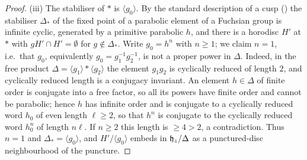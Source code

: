\begin{proof}
(iii) The stabiliser of $*$ is $\langle g_0\rangle$. By the standard description of a cusp (\cite[Ch.\ 10]{Bea83}) the stabiliser $\Delta_*$ of the fixed point of a parabolic element of a Fuchsian group is infinite cyclic, generated by a primitive parabolic $h$, and there is a horodisc $H'$ at $*$ with $gH' \cap H' = \emptyset$ for $g \notin \Delta_*$. Write $g_0 = h^n$ with $n \ge 1$; we claim $n=1$, i.e.\ that $g_0$, equivalently $g_0 = g_1^{-1}g_2^{-1}$, is not a proper power in $\Delta$. Indeed, in the free product $\Delta = \langle g_1\rangle * \langle g_2\rangle$ the element $g_1g_2$ is cyclically reduced of length $2$, and cyclically reduced length is a conjugacy invariant. An element $h \in \Delta$ of finite order is conjugate into a free factor, so all its powers have finite order and cannot be parabolic; hence $h$ has infinite order and is conjugate to a cyclically reduced word $h_0$ of even length $\ell \ge 2$, so that $h^n$ is conjugate to the cyclically reduced word $h_0^n$ of length $n\ell$. If $n \ge 2$ this length is $\ge 4 > 2$, a contradiction. Thus $n=1$ and $\Delta_* = \langle g_0\rangle$, and $H'/\langle g_0\rangle$ embeds in $\mathfrak{h}_z/\Delta$ as a punctured-disc neighbourhood of the puncture.


\end{proof}
